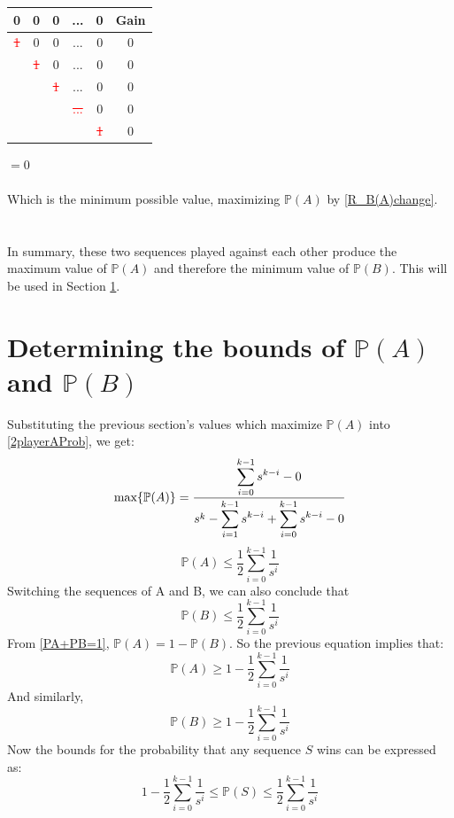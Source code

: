 \documentclass[english,12pt,a4paper,final]{article}
\begin{document}
\begin{tabular}{|ccccc|c|}
	\hline
	0 & 0 & 0 & ... & 0 & Gain \\
	\hline
	
	\textcolor{red}{\sout{1}} & 0 & 0 & ... & 0 & $0$\\
	
	& \textcolor{red}{\sout{1}} & 0 & ... & 0 & $0$\\
	
	&  & \textcolor{red}{\sout{1}} & ... & 0 & $0$\\
	
	&  &  & \textcolor{red}{\sout{...}} & 0 & $0$ \\
	
	&  &  &  & \textcolor{red}{\sout{1}} & $0$ \\
	\hline
\end{tabular}
$=0$
\\\\
Which is the minimum possible value, maximizing $\mathbb{P}(A)$ by \eqref{R_B(A)change}.
\\\\\\
In summary, these two sequences played against each other produce the maximum value of $\mathbb{P}(A)$ and therefore the minimum value of $\mathbb{P}(B)$. This will be used in Section \ref{bounds}.

\section{Determining the bounds of $\mathbb{P}(A)$ and $\mathbb{P}(B)$}\label{bounds}

Substituting the previous section's values which maximize $\mathbb{P}(A)$ into \eqref{2playerAProb}, we get:
\begin{equation*}
	\text{max}\{\mathbb{P}(A)\} = \frac{\mathlarger{\sum_{i=0}^{k-1}s^{k-i}} - 0}{s^k-\mathlarger{\sum_{i=1}^{k-1}s^{k-i}}+\mathlarger{\sum_{i=0}^{k-1}s^{k-i}}-0}
\end{equation*}
\begin{equation*}
	\mathbb{P}(A) \le \frac{1}{2}\sum_{i=0}^{k-1}\frac{1}{s^i}
\end{equation*}
Switching the sequences of A and B, we can also conclude that
\begin{equation*}
	\mathbb{P}(B) \le \frac{1}{2}\sum_{i=0}^{k-1}\frac{1}{s^i}
\end{equation*}
From \eqref{PA+PB=1}, $\mathbb{P}(A) = 1-\mathbb{P}(B)$. So the previous equation implies that:
\begin{equation*}
	\mathbb{P}(A) \ge 1-\frac{1}{2}\sum_{i=0}^{k-1}\frac{1}{s^i}
\end{equation*}
And similarly,
\begin{equation*}
	\mathbb{P}(B) \ge 1-\frac{1}{2}\sum_{i=0}^{k-1}\frac{1}{s^i}
\end{equation*}
Now the bounds for the probability that any sequence $S$ wins can be expressed as:
\begin{equation}\label{PBounds}
	1-\frac{1}{2}\sum_{i=0}^{k-1}\frac{1}{s^i} \le \mathbb{P}(S) \le \frac{1}{2}\sum_{i=0}^{k-1}\frac{1}{s^i}
\end{equation}
\end{document}
